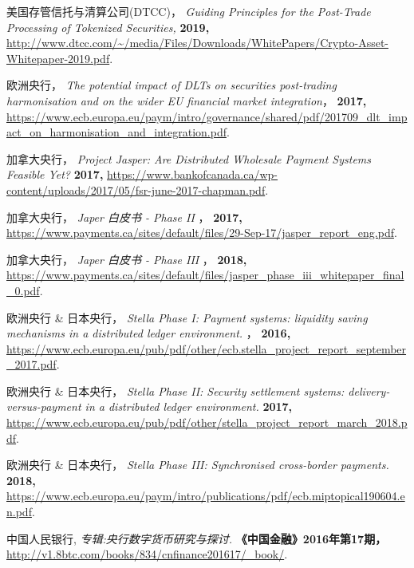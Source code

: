 \begin{thebibliography}{99}
     美国存管信托与清算公司(DTCC)，
    \newblock \textit{Guiding Principles for the Post-Trade Processing of  Tokenized Securities, }
    \newblock \textbf{2019,}
    \newblock \url{http://www.dtcc.com/~/media/Files/Downloads/WhitePapers/Crypto-Asset-Whitepaper-2019.pdf}.

     欧洲央行，
    \newblock \textit{The potential impact of DLTs on securities post-trading harmonisation and on the wider EU financial market integration}，
    \newblock \textbf{2017,}
    \newblock \url{https://www.ecb.europa.eu/paym/intro/governance/shared/pdf/201709_dlt_impact_on_harmonisation_and_integration.pdf}.

     加拿大央行，
    \newblock \textit{Project Jasper: Are Distributed Wholesale Payment Systems Feasible Yet?}
    \newblock \textbf{2017,}
    \newblock \url{https://www.bankofcanada.ca/wp-content/uploads/2017/05/fsr-june-2017-chapman.pdf}.

     加拿大央行，
    \newblock \textit{Japer 白皮书 - Phase II }，
    \newblock \textbf{2017,}
    \newblock \url{https://www.payments.ca/sites/default/files/29-Sep-17/jasper_report_eng.pdf}.

     加拿大央行，
    \newblock \textit{Japer 白皮书 - Phase III }，
    \newblock \textbf{2018,}
    \newblock \url{https://www.payments.ca/sites/default/files/jasper_phase_iii_whitepaper_final_0.pdf}.
    
     欧洲央行 \& 日本央行，
    \newblock \textit{Stella Phase I: Payment systems: liquidity saving mechanisms in a distributed ledger environment. }，
    \newblock \textbf{2016,}
    \newblock \url{https://www.ecb.europa.eu/pub/pdf/other/ecb.stella_project_report_september_2017.pdf}.
    
     欧洲央行 \& 日本央行，
    \newblock \textit{Stella Phase II: Security settlement systems: delivery-versus-payment in a distributed ledger environment. }
    \newblock \textbf{2017,}
    \newblock \url{https://www.ecb.europa.eu/pub/pdf/other/stella_project_report_march_2018.pdf}.

     欧洲央行 \& 日本央行，
    \newblock \textit{Stella Phase III: Synchronised cross-border payments. }
    \newblock \textbf{2018,}
    \newblock \url{https://www.ecb.europa.eu/paym/intro/publications/pdf/ecb.miptopical190604.en.pdf}.

     中国人民银行,
    \newblock \textit{专辑:央行数字货币研究与探讨. }
    \newblock \textbf{《中国金融》2016年第17期，}
    \newblock \url{http://v1.8btc.com/books/834/cnfinance201617/_book/}.
    

\end{thebibliography}
